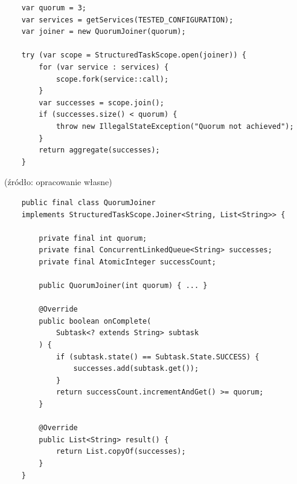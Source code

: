 \newpage
\begin{listing}[!ht]
    \begin{verbatim}
    var quorum = 3;
    var services = getServices(TESTED_CONFIGURATION);
    var joiner = new QuorumJoiner(quorum);

    try (var scope = StructuredTaskScope.open(joiner)) {
        for (var service : services) {
            scope.fork(service::call);
        }
        var successes = scope.join();
        if (successes.size() < quorum) {
            throw new IllegalStateException("Quorum not achieved");
        }
        return aggregate(successes);
    }
    \end{verbatim}
    \vspace{-10pt}
    \caption{Uproszczona implementacja agregacji wyników w~oparciu o~mechanizm kworum w~ramach scenariusza $\mathcal{B}$ w~wariancie \texttt{Loom}}
    \label{listing:scenario-B-loom-code-1}
\end{listing}

\vspace{-20pt}
\begin{center}
    \small{(źródło: opracowanie własne)}
\end{center}

\begin{listing}[!ht]
    \begin{verbatim}
    public final class QuorumJoiner
    implements StructuredTaskScope.Joiner<String, List<String>> {
        
        private final int quorum;
        private final ConcurrentLinkedQueue<String> successes;
        private final AtomicInteger successCount;

        public QuorumJoiner(int quorum) { ... }

        @Override
        public boolean onComplete(
            Subtask<? extends String> subtask
        ) {
            if (subtask.state() == Subtask.State.SUCCESS) {
                successes.add(subtask.get());
            }
            return successCount.incrementAndGet() >= quorum;
        }

        @Override
        public List<String> result() {
            return List.copyOf(successes);
        }
    }
    \end{verbatim}
    \vspace{-10pt}
    \caption{Implementacja własnej strategii agregacji wyników w oparciu o~mechanizm kworum w ramach scenariusza $\mathcal{B}$ w wariancie \texttt{Loom}}
    \label{listing:scenario-B-loom-code-2}
\end{listing}

